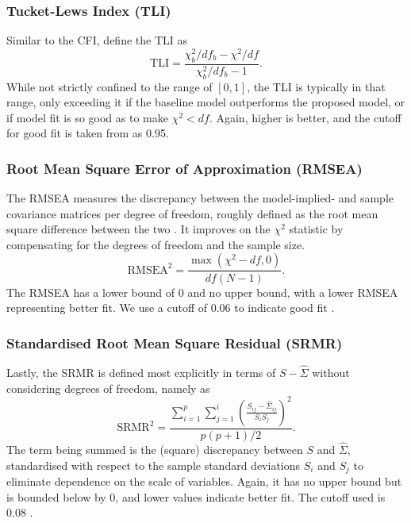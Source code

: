 \subsubsection{Tucket-Lews Index (TLI)}
Similar to the CFI,  define the TLI as
\begin{equation}
    \text{TLI} = \frac{\chi_b^2 / df_b - \chi^2 / df}{\chi_b^2 / df_b - 1}.
\end{equation}
While not strictly confined to the range of $[0, 1]$, the TLI is typically in that range, only exceeding it
if the baseline model outperforms the proposed model, or if model fit is so good as to make $\chi^2 < df$.
Again, higher is better, and the cutoff for good fit is taken from  as 0.95.

\subsubsection{Root Mean Square Error of Approximation (RMSEA)}
The RMSEA measures the discrepancy between the model-implied- and sample covariance matrices per degree of freedom,
roughly defined as the root mean square difference between the two \cite{schermelleh2003evaluating}.
It improves on the $\chi^2$ statistic by compensating for the degrees of freedom and the sample size.
\begin{equation}
    \text{RMSEA}^2 = \frac{\max(\chi^2 - df, 0)}{df(N - 1)}.
\end{equation}
The RMSEA has a lower bound of 0 and no upper bound, with a lower RMSEA representing better fit.
We use a cutoff of 0.06 to indicate good fit \cite{hu1999cutoff}.

\subsubsection{Standardised Root Mean Square Residual (SRMR)}
Lastly, the SRMR is defined most explicitly in terms of $S - \hat{\Sigma}$ without considering degrees of freedom,
namely as \cite{schermelleh2003evaluating}
\begin{equation}
    \text{SRMR}^2 = \frac{\sum_{i=1}^p\sum_{j=1}^i (\frac{S_{ij} - \hat{\Sigma}_{ij}}{S_i S_j})^2}{p(p+1)/2}.
\end{equation}
The term being summed is the (square) discrepancy between $S$ and $\hat{\Sigma}$, standardised with respect to the sample standard
deviations $S_i$ and $S_j$ to eliminate dependence on the scale of variables.
Again, it has no upper bound but is bounded below by 0, and lower values indicate better fit.
The cutoff used is 0.08 \cite{hu1999cutoff}.


